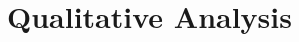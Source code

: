 \documentclass[11pt,a4paper]{article}
\newcommand\todo[1]{{\textcolor{red}{todo: #1}}}
\newcommand\ptgen{\textsc{PtGen}}
\newcommand\tconv{\textsc{TConvS2S}}
\newcommand\xsum{\textsc{XSum}}
\newcommand\hrouge{\textsc{HROUGE}}
\newcommand\rouge{\textsc{ROUGE}}
\begin{document}





\section{Qualitative Analysis}
\label{sec:qanalysis}

\end{document}
